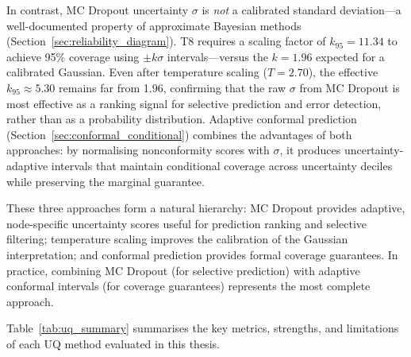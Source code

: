 In contrast, MC Dropout uncertainty $\sigma$ is \emph{not} a calibrated standard deviation---a well-documented property of approximate Bayesian methods (Section~\ref{sec:reliability_diagram}). T8 requires a scaling factor of $k_{95} = 11.34$ to achieve 95\% coverage using $\pm k \sigma$ intervals---versus the $k = 1.96$ expected for a calibrated Gaussian. Even after temperature scaling ($T = 2.70$), the effective $k_{95} \approx 5.30$ remains far from 1.96, confirming that the raw $\sigma$ from MC Dropout is most effective as a ranking signal for selective prediction and error detection, rather than as a probability distribution. Adaptive conformal prediction (Section~\ref{sec:conformal_conditional}) combines the advantages of both approaches: by normalising nonconformity scores with $\sigma$, it produces uncertainty-adaptive intervals that maintain conditional coverage across uncertainty deciles while preserving the marginal guarantee.

These three approaches form a natural hierarchy: MC Dropout provides adaptive, node-specific uncertainty scores useful for prediction ranking and selective filtering; temperature scaling improves the calibration of the Gaussian interpretation; and conformal prediction provides formal coverage guarantees. In practice, combining MC Dropout (for selective prediction) with adaptive conformal intervals (for coverage guarantees) represents the most complete approach.

Table~\ref{tab:uq_summary} summarises the key metrics, strengths, and limitations of each UQ method evaluated in this thesis.

